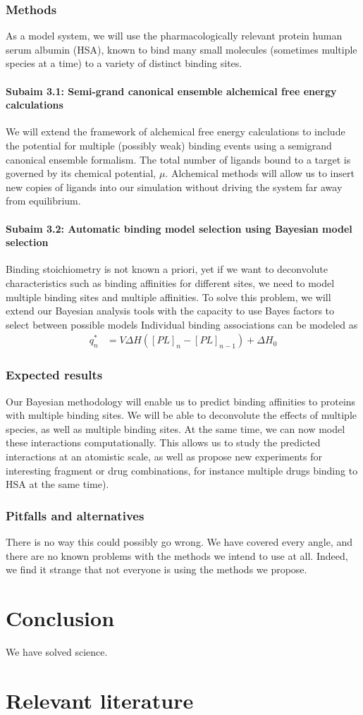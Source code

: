 \documentclass[10pt]{article}
\newcommand{\subsubsubsection}[1]{\paragraph*{#1}}
\begin{document}
\subsubsection*{Methods}
As a model system, we will use the pharmacologically relevant protein human serum albumin (HSA), known to bind many small molecules (sometimes multiple species at a time) to a variety of distinct binding sites.
\subsubsubsection{Subaim 3.1: Semi-grand canonical ensemble alchemical free energy calculations}
We will extend the framework of alchemical free energy calculations to include the potential for multiple (possibly weak) binding events using a semigrand canonical ensemble formalism. The total number of ligands bound to a target is governed by its chemical potential, $\mu$. Alchemical methods will allow us to insert new copies of ligands into our simulation without driving the system far away from equilibrium. 

\subsubsubsection{Subaim 3.2: Automatic binding model selection using Bayesian model selection}
Binding stoichiometry is not known a priori, yet if we want to deconvolute characteristics such as binding affinities for different sites, we need to model multiple binding sites and multiple affinities. To solve this problem, we will extend our Bayesian analysis tools with the capacity to use Bayes factors to select between possible models 
Individual binding associations can be modeled as 
\begin{align}
q_n^* &= V \Delta H \left( [PL]_n - [PL]_{n-1} \right) + \Delta H_0 \label{equation:liberated-heat}
\end{align}

\subsubsection*{Expected results}
Our Bayesian methodology will enable us to predict binding affinities to proteins with multiple binding sites. We will be able to deconvolute the effects of multiple species, as well as multiple binding sites. At the same time, we can now model these interactions computationally. This allows us to study the predicted interactions at an atomistic scale, as well as propose new experiments for interesting fragment or drug combinations, for instance multiple drugs binding to HSA at the same time).

\subsubsection*{Pitfalls and alternatives}
There is no way this could possibly go wrong. We have covered every angle, and there are no known problems with the methods we intend to use at all. Indeed, we find it strange that not everyone is using the methods we propose. 
\section*{Conclusion}
We have solved science. 

\printbibliography
\nocite{*}
\section*{Relevant literature}
\printbibliography[heading=none]
\end{document}
